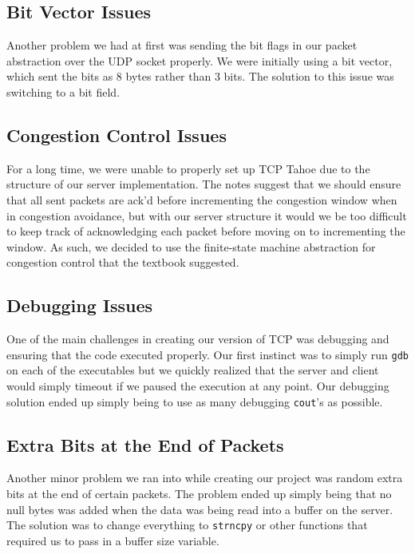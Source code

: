 \documentclass{article}
\begin{document}
\subsection{Bit Vector Issues}

Another problem we had at first was sending the bit flags in our packet abstraction over the UDP socket properly. We were initially using a bit vector, which sent the bits as 8 bytes rather than 3 bits. The solution to this issue was switching to a bit field. 

\subsection{Congestion Control Issues}

For a long time, we were unable to properly set up TCP Tahoe due to the structure of our server implementation. The notes suggest that we should ensure that all sent packets are ack'd before incrementing the congestion window when in congestion avoidance, but with our server structure it would we be too difficult to keep track of acknowledging each packet before moving on to incrementing the window. As such, we decided to use the finite-state machine abstraction for congestion control that the textbook suggested.

\subsection{Debugging Issues}

One of the main challenges in creating our version of TCP was debugging and ensuring that the code executed properly. Our first instinct was to simply run \texttt{gdb} on each of the executables but we quickly realized that the server and client would simply timeout if we paused the execution at any point. Our debugging solution ended up simply being to use as many debugging \texttt{cout}'s as possible.

\subsection{Extra Bits at the End of Packets}

Another minor problem we ran into while creating our project was random extra bits at the end of certain packets. The problem ended up simply being that no null bytes was added when the data was being read into a buffer on the server. The solution was to change everything to \texttt{strncpy} or other functions that required us to pass in a buffer size variable.
\end{document}
